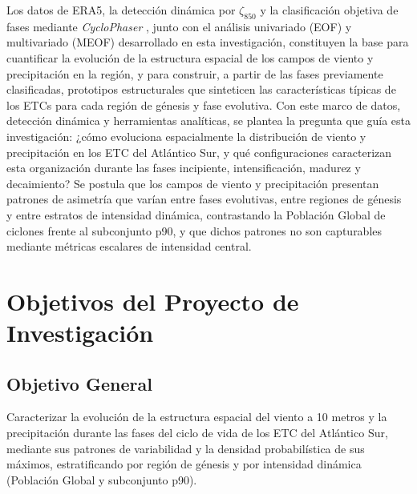 
Los datos de ERA5, la detección dinámica por $\zeta_{850}$ \citep{gramcianinov2020analysis} y la clasificación objetiva de fases mediante \textit{CycloPhaser} \citep{coutodesouza2024new, deSouza2025CycloPhaser}, junto con el análisis univariado (EOF) y multivariado (MEOF) desarrollado en esta investigación, constituyen la base para cuantificar la evolución de la estructura espacial de los campos de viento y precipitación en la región, y para construir, a partir de las fases previamente clasificadas, prototipos estructurales que sinteticen las características típicas de los ETCs para cada región de génesis y fase evolutiva.
Con este marco de datos, detección dinámica y herramientas analíticas, se plantea la pregunta que guía esta investigación: ¿cómo evoluciona espacialmente la distribución de viento y precipitación en los ETC del Atlántico Sur, y qué configuraciones caracterizan esta organización durante las fases incipiente, intensificación, madurez y decaimiento?
Se postula que los campos de viento y precipitación presentan patrones de asimetría que varían entre fases evolutivas, entre regiones de génesis y entre estratos de intensidad dinámica, contrastando la Población Global de ciclones frente al subconjunto p90, y que dichos patrones no son capturables mediante métricas escalares de intensidad central.

\section{Objetivos del Proyecto de Investigación}

\subsection{Objetivo General}
Caracterizar la evolución de la estructura espacial del viento a 10 metros y la precipitación durante las fases del ciclo de vida de los ETC del Atlántico Sur, mediante sus patrones de variabilidad y la densidad probabilística de sus máximos, estratificando por región de génesis y por intensidad dinámica (Población Global y subconjunto p90).

